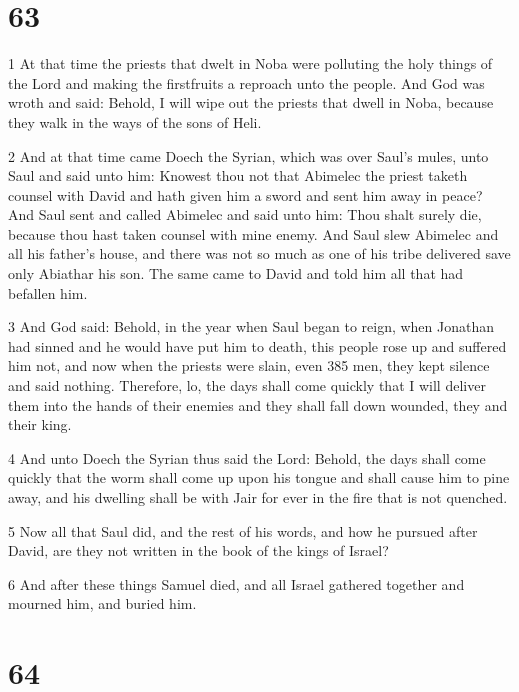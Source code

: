 \chapter{63}

\par 1 At that time the priests that dwelt in Noba were polluting the holy things of the Lord and making the firstfruits a reproach unto the people. And God was wroth and said: Behold, I will wipe out the priests that dwell in Noba, because they walk in the ways of the sons of Heli. 

\par 2 And at that time came Doech the Syrian, which was over Saul's mules, unto Saul and said unto him: Knowest thou not that Abimelec the priest taketh counsel with David and hath given him a sword and sent him away in peace? And Saul sent and called Abimelec and said unto him: Thou shalt surely die, because thou hast taken counsel with mine enemy. And Saul slew Abimelec and all his father's house, and there was not so much as one of his tribe delivered save only Abiathar his son. The same came to David and told him all that had befallen him. 

\par 3 And God said: Behold, in the year when Saul began to reign, when Jonathan had sinned and he would have put him to death, this people rose up and suffered him not, and now when the priests were slain, even 385 men, they kept silence and said nothing. Therefore, lo, the days shall come quickly that I will deliver them into the hands of their enemies and they shall fall down wounded, they and their king. 

\par 4 And unto Doech the Syrian thus said the Lord: Behold, the days shall come quickly that the worm shall come up upon his tongue and shall cause him to pine away, and his dwelling shall be with Jair for ever in the fire that is not quenched.

\par 5 Now all that Saul did, and the rest of his words, and how he pursued after David, are they not written in the book of the kings of Israel? 

\par 6 And after these things Samuel died, and all Israel gathered together and mourned him, and buried him.

\chapter{64}

